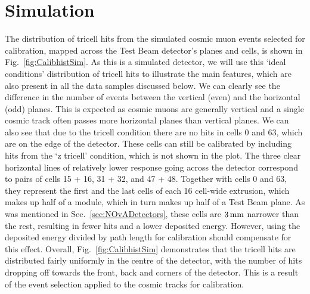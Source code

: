 \section{Simulation}\label{sec:SimulationResults}
The distribution of tricell hits from the simulated cosmic muon events selected for calibration, mapped across the Test Beam detector's planes and cells, is shown in Fig.~\ref{fig:CalibhistSim}. As this is a simulated detector, we will use this `ideal conditions' distribution of tricell hits to illustrate the main features, which are also present in all the data samples discussed below. We can clearly see the difference in the number of events between the vertical (even) and the horizontal (odd) planes. This is expected as cosmic muons are generally vertical and a single cosmic track often passes more horizontal planes than vertical planes. We can also see that due to the tricell condition there are no hits in cells 0 and 63, which are on the edge of the detector. These cells can still be calibrated by including hits from the `z tricell' condition, which is not shown in the plot. The three clear horizontal lines of relatively lower response going across the detector correspond to pairs of cells 15 + 16, 31 + 32, and 47 + 48. Together with cells 0 and 63, they represent the first and the last cells of each 16 cell-wide extrusion, which makes up half of a module, which in turn makes up half of a Test Beam plane. As was mentioned in Sec.~\ref{sec:NOvADetectors}, these cells are $\unit[3]{mm}$ narrower than the rest, resulting in fewer hits and a lower deposited energy. However, using the deposited energy divided by path length for calibration should compensate for this effect. Overall, Fig.~\ref{fig:CalibhistSim} demonstrates that the tricell hits are distributed fairly uniformly in the centre of the detector, with the number of hits dropping off towards the front, back and corners of the detector. This is a result of the event selection applied to the cosmic tracks for calibration.

